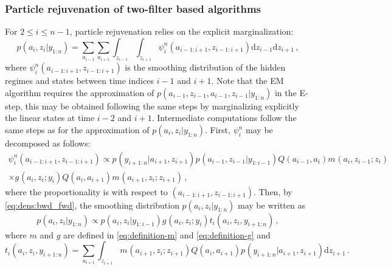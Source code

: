 \documentclass[nolayout]{article}
\theoremstyle{plain}
\theoremstyle{definition}
\newcommand{\1}{\mathbbm{1}}
\def\rmd{\mathrm{d}}
\def\eqsp{\,}
\begin{document}
\subsubsection{Particle rejuvenation of two-filter based algorithms}
\label{sec:tf:rejuv}
For $2\le i \le n-1$, particle rejuvenation relies on the explicit marginalization:
\begin{equation}
\label{eq:dens:bwd_fwd}
p(a_{i},z_{i}|y_{1:n})  =  \sum_{a_{i-1}}\sum_{a_{i+1}} \int_{z_{i-1}} \int_{z_{i+1}} \psi^n_{i}(a_{i-1:i+1},z_{i-1:i+1})\rmd z_{i-1}\rmd z_{i+1}\eqsp,
\end{equation}
where $\psi^n_{i}(a_{i-1:i+1},z_{i-1:i+1})$ is the smoothing distribution of the hidden regimes and states between time indices $i-1$ and $i+1$. Note that the EM algorithm requires the approximation of $p(a_{i-1},z_{i-1},a_{i-1},z_{i-1}|y_{1:n})$ in the E-step, this may be obtained following the same steps by marginalizing explicitly the linear states at time $i-2$ and $i+1$. Intermediate computations follow the same steps as  for the approximation of $p(a_{i},z_{i}|y_{1:n})$. First, $\psi^n_{i}$ may be decomposed as follows:
\begin{multline*}
\psi^n_{i}(a_{i-1:i+1},z_{i-1:i+1}) \propto p_{}(y_{i+1:n}|a_{i+1},z_{i+1})p_{}(a_{i-1},z_{i-1}|y_{1:i-1})Q(a_{i-1},a_{i})m_{}(a_{i},z_{i-1};z_{i})\\
\times g_{}(a_{i},z_{i};y_{i})Q(a_{i},a_{i+1})m_{}(a_{i+1},z_{i};z_{i+1})\eqsp,
\end{multline*}
where the proportionality is with respect to $(a_{i-1:i+1},z_{i-1:i+1})$. Then, by \eqref{eq:dens:bwd_fwd}, the smoothing distribution $p(a_{i},z_{i}|y_{1:n}) $ may be written as
\begin{equation}
\label{eq:smoothing}
p(a_{i},z_{i}|y_{1:n})   \propto p(a_{i},z_{i}|y_{1:i-1})g_{}(a_{i},z_{i};y_{i})t_{i}(a_i,z_i,y_{i+1:n})\eqsp,
\end{equation}
where $m$ and $g$ are defined in \eqref{eq:definition-m} and \eqref{eq:definition-g} and
\begin{equation}
t_{i}(a_i,z_i,y_{i+1:n}) = \sum_{a_{i+1}}\int_{z_{i+1}}m_{}(a_{i+1},z_{i};z_{i+1})Q(a_{i},a_{i+1})p_{}(y_{i+1:n}|a_{i+1},z_{i+1}) \rmd z_{i+1}\eqsp.\label{eq:smooth:t}
\end{equation}
\end{document}
